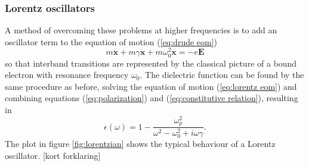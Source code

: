 \subsubsection*{Lorentz oscillators}
A method of overcoming these problems at higher frequencies is to add an oscillator term to the equation of motion (\ref{eq:drude eom})
\begin{equation}
    m\mathbf{\ddot{x}} + m\gamma\mathbf{\dot{x}} + m\omega_0^2\mathbf{x} = -e\mathbf{E}
    \label{eq:lorentz eom}
\end{equation}
so that interband transitions are represented by the classical picture of a bound electron with resonance frequency $\omega_0$. The dielectric function can be found by the same procedure as before, solving the equation of motion (\ref{eq:lorentz eom}) and combining equations (\ref{eq:polarization}) and (\ref{eq:constitutive relation}), resulting in
\begin{equation}
    \epsilon(\omega) = 1 - \frac{\omega_p^2}{\omega^2-\omega_0^2+i\omega\gamma}.
    \label{eq:lorentz osc single}
\end{equation}
The plot in figure \ref{fig:lorentzian} shows the typical behaviour of a Lorentz oscillator. [kort forklaring]

